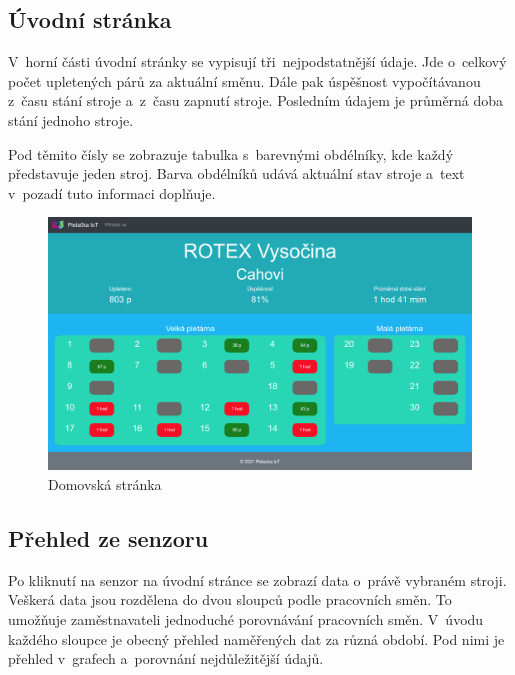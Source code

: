 \subsection{Úvodní stránka}
V~horní části úvodní stránky se vypisují tři~nejpodstatnější údaje.
Jde o~celkový počet upletených párů za aktuální směnu.
Dále pak úspěšnost vypočítávanou z~času stání stroje a~z~času zapnutí stroje.
Posledním údajem je průměrná doba stání jednoho stroje.   

Pod těmito čísly se zobrazuje tabulka s~barevnými obdélníky, kde každý představuje jeden stroj.
Barva obdélníků udává aktuální stav stroje a~text v~pozadí tuto informaci doplňuje. 

\begin{figure}[htbp]
    \centering
    \includegraphics[width=\textwidth]{img/Uvod.png}
    \caption{Domovská stránka}
    \label{fig:webUvod}
\end{figure}

\subsection{Přehled ze senzoru} 
Po kliknutí na senzor na úvodní stránce se zobrazí data o~právě vybraném stroji.
Veškerá data jsou rozdělena do dvou sloupců podle pracovních směn.
To umožňuje zaměstnavateli jednoduché porovnávání pracovních směn.
V~úvodu každého sloupce je obecný přehled naměřených dat za různá období.
Pod nimi je přehled v~grafech a~porovnání nejdůležitější údajů.

